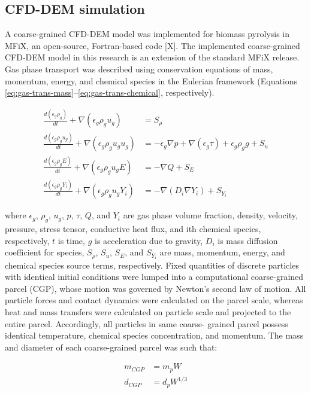 \subsection{CFD-DEM simulation}

A coarse-grained CFD-DEM model was implemented for biomass pyrolysis in MFiX, an open-source, Fortran-based code [X]. The implemented coarse-grained CFD-DEM model in this research is an extension of the standard MFiX release. Gas phase transport was described using conservation equations of mass, momentum, energy, and chemical species in the Eulerian framework (Equations \ref{eq:gas-trans-mass}--\ref{eq:gas-trans-chemical}, respectively).

\begin{align}
    \frac{d(\epsilon_g \rho_g)}{dt} + \nabla (\epsilon_g \rho_g u_g) &= S_\rho \label{eq:gas-trans-mass} \\
    \frac{d(\epsilon_g \rho_g u_g)}{dt} + \nabla (\epsilon_g \rho_g u_g u_g) &= -\epsilon_g \nabla p + \nabla (\epsilon_g \tau) + \epsilon_g \rho_g g + S_u \\
    \frac{d(\epsilon_g \rho_g E)}{dt} + \nabla (\epsilon_g \rho_g u_g E) &= -\nabla Q + S_E \\
    \frac{d(\epsilon_g \rho_g Y_i)}{dt} + \nabla (\epsilon_g \rho_g u_g Y_i) &= -\nabla (D_i \nabla Y_i) + S_{Y_i} \label{eq:gas-trans-chemical}
\end{align}

where $\epsilon_g$, $\rho_g$, $u_g$, $p$, $\tau$, $Q$, and $Y_i$ are gas phase volume fraction, density, velocity, pressure, stress tensor, conductive heat flux, and ith chemical species, respectively, $t$ is time, $g$ is acceleration due to gravity, $D_i$ is mass diffusion coefficient for species, $S_\rho$, $S_u$, $S_E$, and $S_{Y_i}$ are mass, momentum, energy, and chemical species source terms, respectively. Fixed quantities of discrete particles with identical initial conditions were lumped into a computational coarse-grained parcel (CGP), whose motion was governed by Newton’s second law of motion. All particle forces and contact dynamics were calculated on the parcel scale, whereas heat and mass transfers were calculated on particle scale and projected to the entire parcel. Accordingly, all particles in same coarse- grained parcel possess identical temperature, chemical species concentration, and momentum. The mass and diameter of each coarse-grained parcel was such that:

\begin{align}
    m_{CGP} &= m_p W \\
    d_{CGP} &= d_p W^{1/3}
\end{align}

